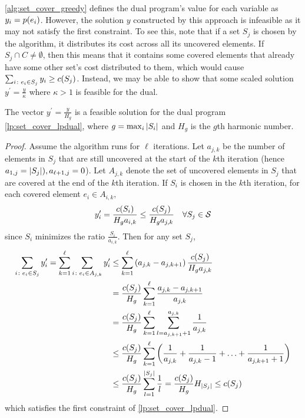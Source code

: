 \cref{alg:set_cover_greedy} defines the dual program's value for each variable as $y_i = \f[p]{e_i}$. 
However, the solution $y$ constructed by this approach is infeasible as it may not satisfy the first constraint. 
To see this, note that if a set $S_j$ is chosen by the algorithm, it distributes its cost across all its uncovered elements. 
If $S_j \cap C \neq \emptyset$, then this means that it contains some covered elements that already have some other set's cost distributed to them, 
which would cause $\sum_{i\colon e_i\in S_j} y_i \geq \f[c]{S_j}$. Instead, we may be able to show that some scaled solution $y^\prime = \frac{y}{\kappa}$
where $\kappa > 1$ is feasible for the dual. 

\begin{lemma}
    The vector $y^\prime = \frac{y}{H_g}$ is a feasible solution for the dual program \cref{lp:set_cover_lpdual}, where $g = \max_i \abs{S_i}$ and 
    $H_g$ is the $g$th harmonic number. 
    \label{lem:set_cover_scaled}
\end{lemma}
\begin{proof}
    Assume the algorithm runs for $\ell$ iterations. Let $a_{j,k}$ be the number of elements in $S_j$ that are still uncovered
    at the start of the $k$th iteration (hence $a_{1, j} = \abs{S_j}), a_{\ell+1, j} = 0$). Let $A_{j,k}$ denote the set of uncovered
    elements in $S_j$ that are covered at the end of the $k$th iteration. If $S_i$ is chosen in the $k$th iteration, for each covered element
    $e_i \in A_{i,k},$
    \[
        y_i^\prime = \frac{\f[c]{S_i}}{H_g a_{i,k}} \leq \frac{\f[c]{S_j}}{H_g a_{j,k}} \quad \forall S_j \in \calS
    \]
    since $S_i$ minimizes the ratio $\frac{S_i}{a_{i,k}}$. Then for any set $S_j$, 
    \begin{align*}
        \sum_{i\colon e_i\in S_j} y_i^\prime = \sum_{k=1}^{\ell} \sum_{i\colon e_i \in A_{j,k}} y_i^\prime 
        &\leq \sum_{k=1}^{\ell} \lrp{a_{j,k} - a_{j,k+1}} \frac{\f[c]{S_j}}{H_g a_{j,k}}\\
        &= \frac{\f[c]{S_j}}{H_g} \sum_{k=1}^{\ell} \frac{a_{j,k} - a_{j, k+1}}{a_{j, k}}\\
        &= \frac{\f[c]{S_j}}{H_g} \sum_{k=1}^{\ell} \sum_{l=a_{j,k+1}+1}^{a_{j,k}} \frac{1}{a_{j,k}}\\
        &\leq \frac{\f[c]{S_j}}{H_g} \sum_{k=1}^{\ell} \lrp{\frac{1}{a_{j,k}} + \frac{1}{a_{j,k}-1} + \ldots + \frac{1}{a_{j,k+1}+1}} \\
        &\leq  \frac{\f[c]{S_j}}{H_g} \sum_{l=1}^{\abs{S_j}} \frac{1}{l} =  \frac{\f[c]{S_j}}{H_g} H_{\abs{S_j}} \leq \f[c]{S_j}
    \end{align*}
    which satisfies the first constraint of \cref{lp:set_cover_lpdual}. 
\end{proof}

